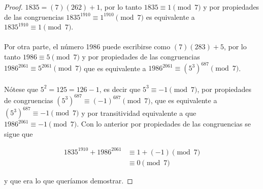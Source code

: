 \documentclass{article}
\begin{document}
	\begin{proof}
		$1835 = (7)(262) + 1$, por lo tanto $1835 \equiv 1 \pmod{7}$ y por propiedades de las congruencias $1835^{1910} \equiv 1^{1910} \pmod{7}$ es equivalente a $1835^{1910} \equiv 1 \pmod{7}$.
		
		\paragraph{} Por otra parte, el número 1986 puede escribirse como $(7)(283) + 5$, por lo tanto $1986 \equiv 5 \pmod{7}$ y por propiedades de las congruencias $1986^{2061} \equiv 5^{2061} \pmod{7}$ que es equivalente a $1986^{2061} \equiv (5^3)^{687} \pmod{7}$.
		
		\paragraph{}Nótese que $5^2 = 125 = 126 - 1$, es decir que $5^3 \equiv -1 \pmod{7}$, por propiedades de congruencias $(5^3)^{687} \equiv (-1)^{687} \pmod{7}$, que es equivalente a $(5^3)^{687} \equiv -1 \pmod{7}$ y por transitividad equivalente a que $1986^{2061} \equiv -1 \pmod{7}$. Con lo anterior por propiedades de las congruencias se sigue que
		
		\begin{align*}
		1835^{1910} + 1986^{2061} &\equiv 1 + (-1) \pmod{7}\\
		&\equiv 0 \pmod{7}
		\end{align*}
		
		y que era lo que queríamos demostrar.
		
	\end{proof}
	
	\nocite{*}
	
	
	
\end{document}
